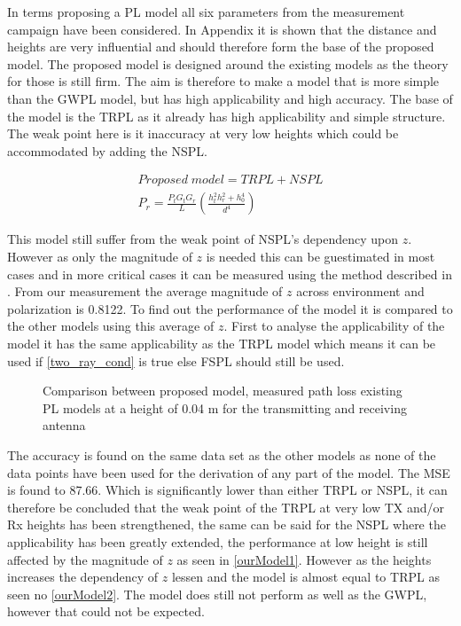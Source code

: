 


In terms proposing a PL model all six parameters from the measurement campaign have been considered. In Appendix it is shown that the distance and heights are very influential and should therefore form the base of the proposed model. %
The proposed model is designed around the existing models as the theory for those is still firm. The aim is therefore to make a model that is more simple than the GWPL model, but has high applicability and high accuracy. The base of the model is the TRPL as it already has high applicability and simple structure. The weak point here is it inaccuracy at very low heights which could be accommodated by adding the NSPL. 

\begin{align}
Proposed\; model = TRPL + NSPL \\
P_r = \frac{P_t G_t G_r }{L}\left(\frac{h_t^2 h_r^2+h_0^4}{d^4}\right)
\end{align}

This model still suffer from the weak point of NSPL's dependency upon $z$. However as only the magnitude of $z$ is needed this can be guestimated in most cases and in more critical cases it can be measured using the method described in \cite{Kim}. From our measurement the average magnitude of $z$ across environment and polarization is 0.8122. To find out the performance of the model it is compared to the other models using this average of $z$. First to analyse the applicability of the model it has the same applicability as the TRPL model which means it can be used if \eqref{two_ray_cond} is true else FSPL should still be used. 

\begin{figure}[!htbp]
\centering

\caption{Comparison between proposed model, measured path loss existing PL models at a height of 0.04 m for the transmitting and receiving antenna}
\label{ourModel1}
\end{figure}


The accuracy is found on the same data set as the other models as none of the data points have been used for the derivation of any part of the model. The MSE is found to 87.66. Which is significantly lower than either TRPL or NSPL, it can therefore be concluded that the weak point of the TRPL at very low TX and/or Rx heights has been strengthened, the same can be said for the NSPL where the applicability has been greatly extended, the performance at low height is still affected by the magnitude of $z$ as seen in \autoref{ourModel1}. However as the heights increases the dependency of $z$ lessen and the model is almost equal to TRPL as seen no \autoref{ourModel2}. The model does still not perform as well as the GWPL, however that could not be expected.



